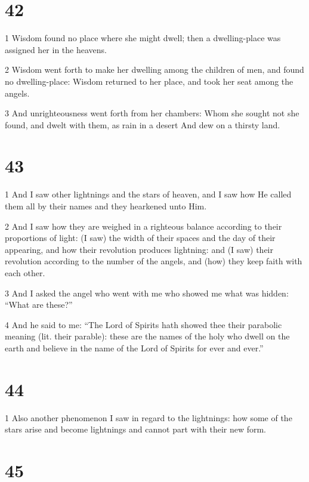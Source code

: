 \chapter{42}

\par 1 Wisdom found no place where she might dwell; then a dwelling-place was assigned her in the heavens.
\par 2 Wisdom went forth to make her dwelling among the children of men, and found no dwelling-place: Wisdom returned to her place, and took her seat among the angels.
\par 3 And unrighteousness went forth from her chambers: Whom she sought not she found, and dwelt with them, as rain in a desert And dew on a thirsty land.

\chapter{43}

\par 1 And I saw other lightnings and the stars of heaven, and I saw how He called them all by their names and they hearkened unto Him.
\par 2 And I saw how they are weighed in a righteous balance according to their proportions of light: (I saw) the width of their spaces and the day of their appearing, and how their revolution produces lightning: and (I saw) their revolution according to the number of the angels, and (how) they keep faith with each other.
\par 3 And I asked the angel who went with me who showed me what was hidden: “What are these?”
\par 4 And he said to me: “The Lord of Spirits hath showed thee their parabolic meaning (lit. their parable): these are the names of the holy who dwell on the earth and believe in the name of the Lord of Spirits for ever and ever.”

\chapter{44}

\par 1 Also another phenomenon I saw in regard to the lightnings: how some of the stars arise and become lightnings and cannot part with their new form.

\chapter{45}

